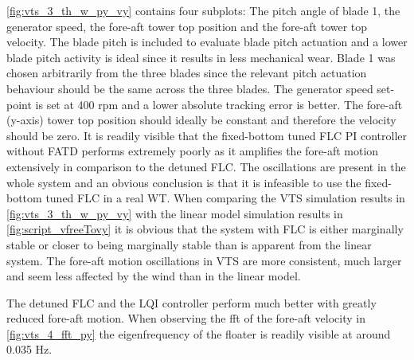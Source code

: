 \cref{fig:vts_3_th_w_py_vy} contains four subplots: The pitch angle of blade 1, the generator speed, the fore-aft tower top position and the fore-aft tower top velocity. The blade pitch is included to evaluate blade pitch actuation and a lower blade pitch activity is ideal since it results in less mechanical wear. Blade 1 was chosen arbitrarily from the three blades since the relevant pitch actuation behaviour should be the same across the three blades. The generator speed set-point is set at 400 rpm and a lower absolute tracking error is better. The fore-aft (y-axis) tower top position should ideally be constant and therefore the velocity should be zero. It is readily visible that the fixed-bottom tuned FLC PI controller without FATD performs extremely poorly as it amplifies the fore-aft motion extensively in comparison to the detuned FLC. The oscillations are present in the whole system and an obvious conclusion is that it is infeasible to use the fixed-bottom tuned FLC in a real WT. When comparing the VTS simulation results in \cref{fig:vts_3_th_w_py_vy} with the linear model simulation results in \cref{fig:script_vfreeTovy} it is obvious that the system with FLC is either marginally stable or closer to being marginally stable than is apparent from the linear system. The fore-aft motion oscillations in VTS are more consistent, much larger and seem less affected by the wind than in the linear model. 

The detuned FLC and the LQI controller perform much better with greatly reduced fore-aft motion. When observing the fft of the fore-aft velocity in \cref{fig:vts_4_fft_py} the eigenfrequency of the floater is readily visible at around 0.035 Hz.

